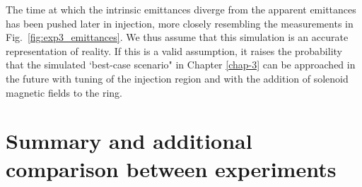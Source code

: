 %
The time at which the intrinsic emittances diverge from the apparent emittances has been pushed later in injection, more closely resembling the measurements in Fig.~\ref{fig:exp3_emittances}. We thus assume that this simulation is an accurate representation of reality. If this is a valid assumption, it raises the probability that the simulated `best-case scenario" in Chapter \ref{chap-3} can be approached in the future with tuning of the injection region and with the addition of solenoid magnetic fields to the ring.



\section{Summary and additional comparison between experiments}

